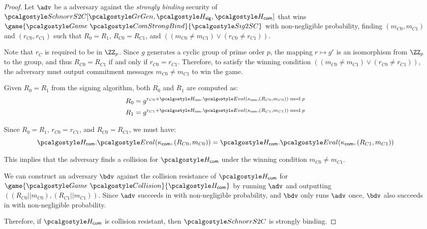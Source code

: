 \begin{proof}
	Let $\adv$ be a \ppt adversary against the \emph{strongly binding} security of $\algo{SchnorrS2C}[\grgen, \algo{H}_{\mathsf{sig}}, \algo{H}_{\mathsf{com}}]$ that wins $\game{\Game~\algo{ComStrongBind}}{\algo{Sig2SC}}$ with non-negligible probability, finding $(m_{C0}, m_{C1})$ and $(r_{C0}, r_{C1})$ such that $R_0=R_1$, $R_{C0}=R_{C1}$, and $((m_{C0} \neq m_{C1}) \vee (r_{C0} \neq r_{C1}))$.

	Note that $r_C$ is required to be in $\ZZ_p$. Since $g$ generates a cyclic group of prime order $p$, the mapping $r \mapsto g^r$ is an isomorphism from $\ZZ_p$ to the group, and thus $R_{C0} = R_{C1}$ if and only if $r_{C0} = r_{C1}$. Therefore, to satisfy the winning condition $((m_{C0} \neq m_{C1}) \vee (r_{C0} \neq r_{C1}))$, the adversary must output commitment messages $m_{C0} \neq m_{C1}$ to win the game.

	Given $R_0 = R_1$ from the signing algorithm, both $R_0$ and $R_1$ are computed as:
	\begin{align}
		R_0 &= g^{r_{C0} + \algo{H}_{\mathsf{com}}.\algo{Eval}(\kappa_{\mathsf{com}}, (R_{C0}, m_{C0})) \bmod p} \\
		R_1 &= g^{r_{C1} + \algo{H}_{\mathsf{com}}.\algo{Eval}(\kappa_{\mathsf{com}}, (R_{C1}, m_{C1})) \bmod p}
	\end{align}

	Since $R_0 = R_1$, $r_{C0} = r_{C1}$, and $R_{C0} = R_{C1}$, we must have:
	\[
	\algo{H}_{\mathsf{com}}.\algo{Eval}(\kappa_{\mathsf{com}}, (R_{C0}, m_{C0})) = \algo{H}_{\mathsf{com}}.\algo{Eval}(\kappa_{\mathsf{com}}, (R_{C1}, m_{C1}))
	\]

	This implies that the adversary finds a collision for $\algo{H}_{\mathsf{com}}$ under the winning condition $m_{C0} \neq m_{C1}$.

	We can construct an adversary $\bdv$ against the collision resistance of $\algo{H}_{\mathsf{com}}$ for $\game{\Game~\algo{Collision}}{\algo{H}_{\mathsf{com}}}$ by running $\adv$ and outputting $((R_{C0} || m_{C0}), (R_{C1} || m_{C1}))$. Since $\adv$ succeeds in \ppt with non-negligible probability, and $\bdv$ only runs $\adv$ once, $\bdv$ also succeeds in \ppt with non-negligible probability.

	Therefore, if $\algo{H}_{\mathsf{com}}$ is collision resistant, then $\algo{SchnorrS2C}$ is strongly binding.
\end{proof}
